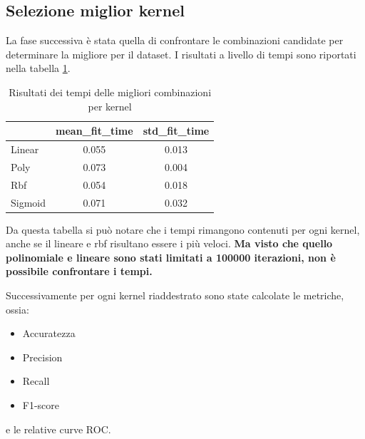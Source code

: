 \subsection{Selezione miglior kernel}
La fase successiva è stata quella di confrontare le combinazioni candidate per
determinare la migliore per il dataset. I risultati a livello di tempi sono
riportati nella tabella \ref{tab:top_time_kernels_corr}.
\begin{table}[!ht]
    \centering
    \begin{tabular}{@{}lcc@{}}
        \toprule
        \rowcolor[HTML]{EFEFEF}
        \multicolumn{1}{c}{\cellcolor[HTML]{EFEFEF}\textbf{kernel}} & \textbf{mean\_fit\_time} & \textbf{std\_fit\_time} \\ \midrule
        Linear                                                      & 0.055                    & 0.013                   \\
        Poly                                                        & 0.073                    & 0.004                   \\
        Rbf                                                         & 0.054                    & 0.018                   \\
        Sigmoid                                                     & 0.071                    & 0.032                   \\ \bottomrule
    \end{tabular}
    \caption{Risultati dei tempi delle migliori combinazioni per kernel}
    \label{tab:top_time_kernels_corr}
\end{table}

Da questa tabella si può notare che i tempi rimangono contenuti per ogni kernel,
anche se il lineare e rbf risultano essere i più veloci. \textbf{Ma visto che quello polinomiale
    e lineare sono stati limitati a 100000 iterazioni, non è possibile confrontare i tempi.}

Successivamente per ogni kernel riaddestrato sono state calcolate
le metriche, ossia:
\begin{itemize}
    \item Accuratezza
    \item Precision
    \item Recall
    \item F1-score
\end{itemize}
e le relative curve ROC.

